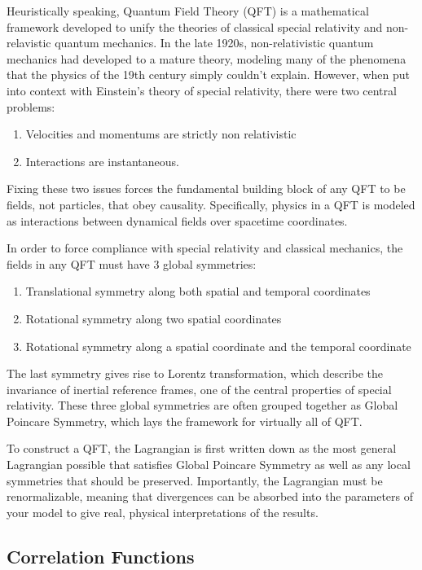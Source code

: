 Heuristically speaking, Quantum Field Theory (QFT) is a mathematical framework developed to unify the theories of classical special relativity and non-relavistic quantum mechanics. In the late 1920s, non-relativistic quantum mechanics had developed to a mature theory, modeling many of the phenomena that the physics of the 19th century simply couldn't explain. However, when put into context with Einstein's theory of special relativity, there were two central problems: 
\begin{enumerate}
    \item Velocities and momentums are strictly non relativistic 
    \item Interactions are instantaneous. 
\end{enumerate}
Fixing these two issues forces the fundamental building block of any QFT to be fields, not particles, that obey causality. Specifically, physics in a QFT is modeled as interactions between dynamical fields over spacetime coordinates.

In order to force compliance with special relativity and classical mechanics, the fields in any QFT must have 3 global symmetries:
\begin{enumerate}
    \item Translational symmetry along both spatial and temporal coordinates
    \item Rotational symmetry along two spatial coordinates
    \item Rotational symmetry along a spatial coordinate and the temporal coordinate
\end{enumerate}
The last symmetry gives rise to Lorentz transformation, which describe the invariance of inertial reference frames, one of the central properties of special relativity. These three global symmetries are often grouped together as Global Poincare Symmetry, which lays the framework for virtually all of QFT.

To construct a QFT, the Lagrangian is first written down as the most general Lagrangian possible that satisfies Global Poincare Symmetry as well as any local symmetries that should be preserved. Importantly, the Lagrangian must be renormalizable, meaning that divergences can be absorbed into the parameters of your model to give real, physical interpretations of the results.

\subsection{Correlation Functions}

